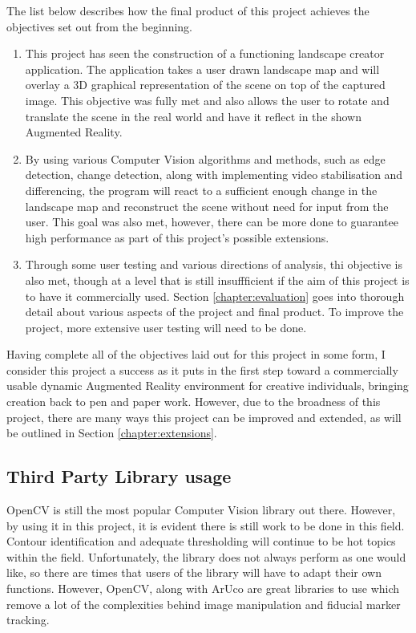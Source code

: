 \documentclass[11pt]{article}
\begin{document}
The list below describes how the final product of this project
achieves the objectives set out from the beginning.

\begin{enumerate}
	\item This project has seen the construction of a 
		functioning landscape creator application. The 
		application takes a user drawn landscape map and will
		overlay a 3D graphical representation of the scene
		on top of the captured image. This objective was fully
		met and also allows the user to rotate and translate
		the scene in the real world and have it reflect in
		the shown Augmented Reality. 
	\item By using various Computer Vision algorithms and
		methods, such as edge detection, change detection, 
		along with implementing video stabilisation and 
		differencing, the program will react to a sufficient
		enough change in the landscape map and reconstruct
		the scene without need for input from the user. This
		goal was also met, however, there can be more done
		to guarantee high performance as part of this project's
		possible extensions.
	\item Through some user testing and various directions
		of analysis, thi objective is also met, though at a
		level that is still insuffficient if the aim of this
		project is to have it commercially used. Section
		\ref{chapter:evaluation} goes into thorough detail
		about various aspects of the project and final 
		product. To improve the project, more extensive
		user testing will need to be done.
\end{enumerate}

Having complete all of the objectives laid out for this
project in some form, I consider this project a success as
it puts in the first step toward a commercially usable
dynamic Augmented Reality environment for creative
individuals, bringing creation back to pen and paper work.
However, due to the broadness of this project, there are
many ways this project can be improved and extended, as
will be outlined in Section \ref{chapter:extensions}.

\subsection{Third Party Library usage}
OpenCV is still the most popular Computer Vision library
out there. However, by using it in this project, it is
evident there is still work to be done in this field. 
Contour identification and adequate thresholding will 
continue to be hot topics within the field. Unfortunately,
the library does not always perform as one would like,
so there are times that users of the library will have to
adapt their own functions. However, OpenCV, along with
ArUco are great libraries to use which remove a lot of
the complexities behind image manipulation and fiducial
marker tracking. 
\end{document}
